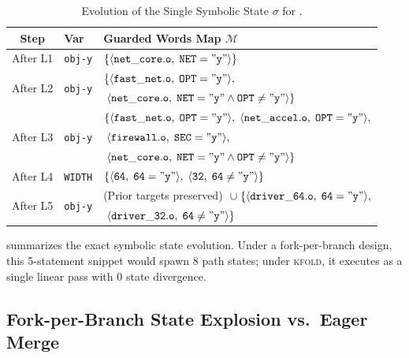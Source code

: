 \documentclass[acmsmall,screen,review]{acmart}
\newcommand{\tool}{\textsc{kfold}\xspace}
\begin{document}
\begin{table}[t]
\centering
\footnotesize
\setlength{\tabcolsep}{4pt}
\caption{Evolution of the Single Symbolic State $\sigma$ for .}
\label{tab:example-trace}
\begin{tabular}{cll}
\toprule
\textbf{Step} & \textbf{Var} & \textbf{Guarded Words Map $\mathcal{M}$} \\
\midrule
After L1 & \texttt{obj-y} & $\{ \langle \mathtt{net\_core.o}, \; \texttt{NET}=\mathtt{"y"} \rangle \}$ \\
\midrule
\multirow{2}{*}{After L2} & \multirow{2}{*}{\texttt{obj-y}} & $\{ \langle \mathtt{fast\_net.o}, \; \texttt{OPT}=\mathtt{"y"} \rangle, $ \\
& & $\; \langle \mathtt{net\_core.o}, \; \texttt{NET}=\mathtt{"y"} \wedge \texttt{OPT}\neq\mathtt{"y"} \rangle \}$ \\
\midrule
\multirow{3}{*}{After L3} & \multirow{3}{*}{\texttt{obj-y}} & $\{ \langle \mathtt{fast\_net.o}, \; \texttt{OPT}=\mathtt{"y"} \rangle, \; \langle \mathtt{net\_accel.o}, \; \texttt{OPT}=\mathtt{"y"} \rangle, $ \\
& & $\; \langle \mathtt{firewall.o}, \; \texttt{SEC}=\mathtt{"y"} \rangle, $ \\
& & $\; \langle \mathtt{net\_core.o}, \; \texttt{NET}=\mathtt{"y"} \wedge \texttt{OPT}\neq\mathtt{"y"} \rangle \}$ \\
\midrule
After L4 & \texttt{WIDTH} & $\{ \langle \mathtt{64}, \; \texttt{64}=\mathtt{"y"} \rangle, \; \langle \mathtt{32}, \; \texttt{64}\neq\mathtt{"y"} \rangle \}$ \\
\midrule
\multirow{2}{*}{After L5} & \multirow{2}{*}{\texttt{obj-y}} & (Prior targets preserved) $\; \cup \; \{ \langle \mathtt{driver\_64.o}, \; \texttt{64}=\mathtt{"y"} \rangle, $ \\
& & $\; \langle \mathtt{driver\_32.o}, \; \texttt{64}\neq\mathtt{"y"} \rangle \}$ \\
\bottomrule
\end{tabular}
\end{table}

 summarizes the exact symbolic state evolution. Under a fork-per-branch design, this 5-statement snippet would spawn 8 path states; under \tool, it executes as a single linear pass with 0 state divergence.

\subsection{Fork-per-Branch State Explosion vs.\ Eager Merge}
\label{sec:overview:fork-vs-merge}
\end{document}

